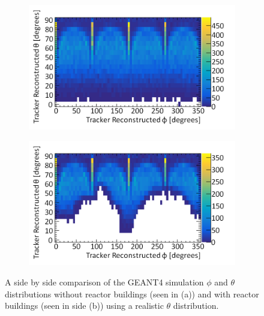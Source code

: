 \begin{figure}[!h]
\centering
\begin{subfigure}{.5\textwidth}
  \centering
  \includegraphics[width=\linewidth]{Chapter6/Figs/Raster/thetaVsPhiSimulatedWithReactor0MedText.png}
  \captionsetup{width=.9\linewidth}
  \caption{}
  \label{subFig:thetaVsPhiSimulatedWithReactor0}
\end{subfigure}%
\begin{subfigure}{.5\textwidth}
  \centering
\includegraphics[width=\linewidth]{Chapter6/Figs/Raster/thetaVsPhiSimulatedWithReactor100MedText.png}
  \captionsetup{width=.9\linewidth}
  \caption{}
  \label{subFig:thetaVsPhiSimulatedWithReactor100}
\end{subfigure}
\caption{A side by side comparison of the GEANT4 simulation $\phi$ and $\theta$ distributions without reactor buildings (seen in (a)) and with reactor buildings (seen in side (b)) using a realistic $\theta$ distribution.}
\label{fig:thetaVsPhiSimulatedWithReactor_0-100}
\end{figure}

